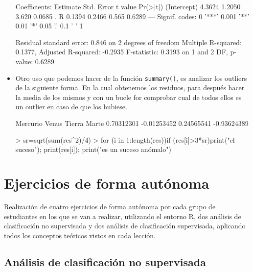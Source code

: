 \documentclass[a4paper, 12pt]{article}
\begin{document}
\begin{itemize}
\begin{Schunk}
\begin{Soutput}
Coefficients:
            Estimate Std. Error t value Pr(>|t|)  
(Intercept)   4.3624     1.2050   3.620   0.0685 .
R             0.1394     0.2466   0.565   0.6289  
---
Signif. codes:  0 '***' 0.001 '**' 0.01 '*' 0.05 '.' 0.1 ' ' 1

Residual standard error: 0.846 on 2 degrees of freedom
Multiple R-squared:  0.1377,	Adjusted R-squared:  -0.2935 
F-statistic: 0.3193 on 1 and 2 DF,  p-value: 0.6289
\end{Soutput}
\end{Schunk}

    	  \item Otro uso que podemos hacer de la función \texttt{summary()}, es analizar los outliers de la siguiente forma. En la cual obtenemos los residuos, para después hacer la media de los mismos y con un bucle for comprobar cual de todos ellos es un outlier en caso de que los hubiese.
\begin{Schunk}
\begin{Soutput}
   Mercurio       Venus      Tierra       Marte 
 0.70312301 -0.01253452  0.24565541 -0.93624389 
\end{Soutput}
\begin{Sinput}
> sr=sqrt(sum(res^2)/4)
> for (i in 1:length(res)){if (res[i]>3*sr){print("el suceso"); print(res[i]); print("es un suceso anómalo")}}
\end{Sinput}
\end{Schunk}
  	\end{itemize}
	
	\newpage
	
	\section{Ejercicios de forma autónoma}
	
	Realización de cuatro ejercicios de forma autónoma por cada grupo de estudiantes en los que se van a realizar, utilizando el entorno R, dos análisis de clasificación no supervisada y dos análisis de clasificación supervisada, aplicando todos los conceptos teóricos vistos en cada lección.
	
	\subsection{Análisis de clasificación no supervisada}
	
\end{document}
